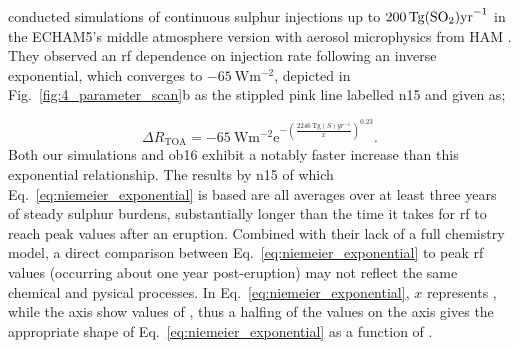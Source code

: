 \documentclass{ametsocV6.1}
\begin{document}
\citet{niemeier2015} conducted simulations of continuous sulphur injections up to
\(\SI{200}{\tera\gram(\ce{SO2})\mathrm{yr}^{-1}}\) in the ECHAM5's middle atmosphere
version \citep{giorgetta2006} with aerosol microphysics from HAM \citep{stier2005}. They
observed an \gls{rf} dependence on  injection rate following an inverse
exponential, which converges to \(\SI{-65}{\watt\meter^{-2}}\), depicted in
Fig.~\ref{fig:4_parameter_scan}b as the stippled pink line labelled \gls{n15} and given
as;

\begin{equation}
  \Delta
  R_{\mathrm{TOA}} =
  -\SI{65}{\watt\metre^{-2}}
  \mathrm{e}^{-{\left(\frac{\SI{2246}{\tera\gram(S)yr^{-1}}}{x}\right)}^{0.23}}.
  \label{eq:niemeier_exponential}
\end{equation}
%
Both our simulations and \gls{ob16} exhibit a notably faster increase than this
exponential relationship. The results by \gls{n15} of which
Eq.~\ref{eq:niemeier_exponential} is based are all averages over at least three years of
steady sulphur burdens, substantially longer than the time it takes for \gls{rf} to
reach peak values after an eruption. Combined with their lack of a full chemistry model,
a direct comparison between Eq.~\ref{eq:niemeier_exponential} to peak \gls{rf} values
(occurring about one year post-eruption) may not reflect the same chemical and pysical
processes. In Eq.~\ref{eq:niemeier_exponential}, \(x\) represents , while the axis
show values of , thus a halfing of the  values on the axis gives the
appropriate shape of Eq.~\ref{eq:niemeier_exponential} as a function of .
\end{document}

